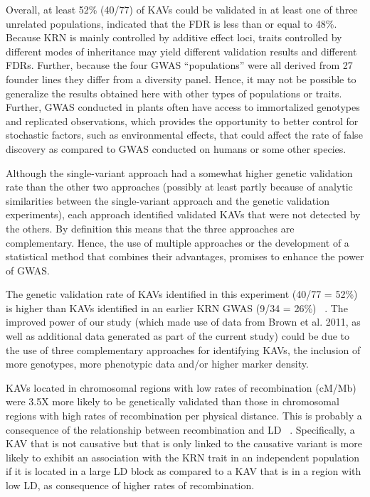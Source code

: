 \documentclass[10pt,letterpaper]{article}
\begin{document}
Overall, at least 52\% (40/77) of KAVs could be validated in at least one of three unrelated populations, indicated that the FDR is less than or equal to 48\%. Because KRN is mainly controlled by additive effect loci, traits controlled by different modes of inheritance may yield different validation results and different FDRs. Further, because the four GWAS “populations” were all derived from 27 founder lines they differ from a diversity panel. Hence, it may not be possible to generalize the results obtained here with other types of populations or traits. Further, GWAS conducted in plants often have access to immortalized genotypes and replicated observations, which provides the opportunity to better control for stochastic factors, such as environmental effects, that could affect the rate of false discovery as compared to GWAS conducted on humans or some other species.

Although the single-variant approach had a somewhat higher genetic validation rate than the other two approaches (possibly at least partly because of analytic similarities between the single-variant approach and the genetic validation experiments), each approach identified validated KAVs that were not detected by the others. By definition this means that the three approaches are complementary. Hence, the use of multiple approaches or the development of a statistical method that combines their advantages, promises to enhance the power of GWAS. 

The genetic validation rate of KAVs identified in this experiment (40/77 = 52\%) is higher than KAVs identified in an earlier KRN GWAS (9/34 = 26\%) ~\cite{Brown2011}. The improved power of our study (which made use of data from Brown et al. 2011, as well as additional data generated as part of the current study) could be due to the use of three complementary approaches for identifying KAVs, the inclusion of more genotypes, more phenotypic data and/or higher marker density. 

KAVs located in chromosomal regions with low rates of recombination (cM/Mb) were 3.5X more likely to be genetically validated than those in chromosomal regions with high rates of recombination per physical distance. This is probably a consequence of the relationship between recombination and LD ~\cite{Kim2007}. Specifically, a KAV that is not causative but that is only linked to the causative variant is more likely to exhibit an association with the KRN trait in an independent population if it is located in a large LD block as compared to a KAV that is in a region with low LD, as consequence of higher rates of recombination.
\end{document}
